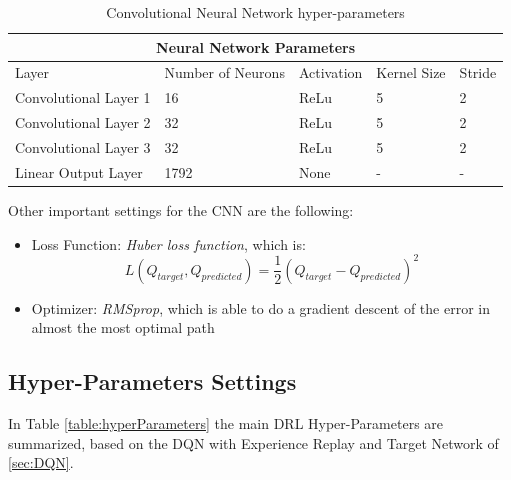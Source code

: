 \begin{table}[h!]
	\centering
	\begin{tabular}{ |p{4cm}|p{3cm}|p{2cm}|p{1.5cm}|p{1.2cm}|  }
		\hline
		\multicolumn{5}{|c|}{Neural Network Parameters} \\
		\hline
		Layer & Number of Neurons & Activation & Kernel Size & Stride \\
		\hline
		Convolutional Layer 1 & 16 & ReLu & 5 & 2\\
		\hline
		Convolutional Layer 2 & 32 & ReLu & 5 & 2 \\
		\hline
		Convolutional Layer 3 & 32 & ReLu & 5 & 2 \\
		\hline
		Linear Output Layer  & 1792 & None & - & - \\
		\hline
	\end{tabular}
	\label{table:NeuralNetwork}
	\caption{Convolutional Neural Network hyper-parameters}
\end{table}
	
Other important settings for the CNN are the following:

\begin{itemize}
	\item Loss Function: \textit{Huber loss function}, which is: 
	\begin{equation}
		L(Q_{target}, Q_{predicted}) = \frac{1}{2}(Q_{target}-Q_{predicted})^2
	\end{equation}
	\item Optimizer: \textit{RMSprop}, which is able to do a gradient descent of the error in almost the most optimal path
\end{itemize}

\subsection{Hyper-Parameters Settings}

In Table \ref{table:hyperParameters} the main DRL Hyper-Parameters are summarized, based on the DQN with Experience Replay and Target Network of \ref{sec:DQN}.



